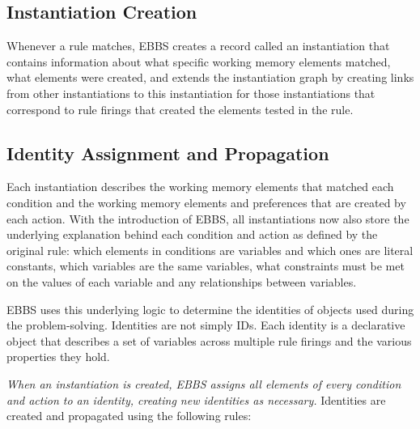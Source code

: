 
\subsection{Instantiation Creation}
\label{CHUNKING-prior-identities}

Whenever a rule matches, EBBS creates a record called an instantiation that contains information about what specific working memory elements matched, what elements were created, and extends the instantiation graph by creating links from other instantiations to this instantiation for those instantiations that correspond to rule firings that created the elements tested in the rule.


\subsection{Identity Assignment and Propagation}
\label{CHUNKING-prior-identities}

Each instantiation describes the working memory elements that matched each condition and the working memory elements and preferences that are created by each action.  With the introduction of EBBS, all instantiations now also store the underlying explanation behind each condition and action as defined by the original rule: which elements in conditions are variables and which ones are literal constants, which variables are the same variables, what constraints must be met on the values of each variable and any relationships between variables.

EBBS uses this underlying logic to determine the identities of objects used during the problem-solving.  Identities are not simply IDs.  Each identity is a declarative object that describes a set of variables across multiple rule firings and the various properties they hold.

\emph{When an instantiation is created, EBBS assigns all elements of every condition and action to an identity, creating new identities as necessary.} Identities are created and propagated using the following rules:

